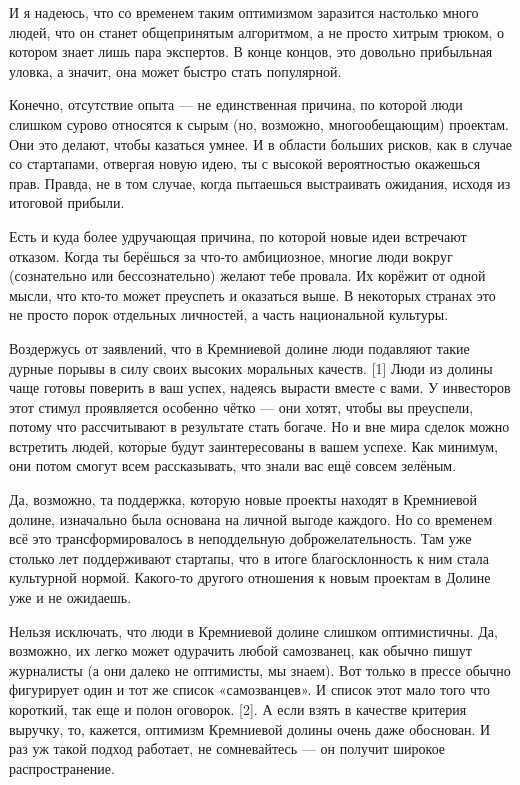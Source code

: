 \documentclass[ebook,12pt,oneside,openany]{memoir}
\begin{document}
И я надеюсь, что со временем таким оптимизмом заразится настолько
много людей, что он станет общепринятым алгоритмом, а не просто хитрым
трюком, о котором знает лишь пара экспертов. В конце концов, это
довольно прибыльная уловка, а значит, она может быстро стать
популярной.

Конечно, отсутствие опыта — не единственная причина, по которой люди
слишком сурово относятся к сырым (но, возможно, многообещающим)
проектам. Они это делают, чтобы казаться умнее. И в области больших
рисков, как в случае со стартапами, отвергая новую идею, ты с высокой
вероятностью окажешься прав. Правда, не в том случае, когда пытаешься
выстраивать ожидания, исходя из итоговой прибыли.

Есть и куда более удручающая причина, по которой новые идеи встречают
отказом. Когда ты берёшься за что-то амбициозное, многие люди вокруг
(сознательно или бессознательно) желают тебе провала. Их корёжит от
одной мысли, что кто-то может преуспеть и оказаться выше. В некоторых
странах это не просто порок отдельных личностей, а часть национальной
культуры.

Воздержусь от заявлений, что в Кремниевой долине люди подавляют такие
дурные порывы в силу своих высоких моральных качеств. [1] Люди из
долины чаще готовы поверить в ваш успех, надеясь вырасти вместе с
вами. У инвесторов этот стимул проявляется особенно чётко — они хотят,
чтобы вы преуспели, потому что рассчитывают в результате стать богаче.
Но и вне мира сделок можно встретить людей, которые будут
заинтересованы в вашем успехе. Как минимум, они потом смогут всем
рассказывать, что знали вас ещё совсем зелёным.

Да, возможно, та поддержка, которую новые проекты находят в Кремниевой
долине, изначально была основана на личной выгоде каждого. Но со
временем всё это трансформировалось в неподдельную доброжелательность.
Там уже столько лет поддерживают стартапы, что в итоге благосклонность
к ним стала культурной нормой. Какого-то другого отношения к новым
проектам в Долине уже и не ожидаешь.

Нельзя исключать, что люди в Кремниевой долине слишком оптимистичны.
Да, возможно, их легко может одурачить любой самозванец, как обычно
пишут журналисты (а они далеко не оптимисты, мы знаем). Вот только в
прессе обычно фигурирует один и тот же список «самозванцев». И список
этот мало того что короткий, так еще и полон оговорок. [2]. А если
взять в качестве критерия выручку, то, кажется, оптимизм Кремниевой
долины очень даже обоснован. И раз уж такой подход работает, не
сомневайтесь — он получит широкое распространение.
\end{document}
